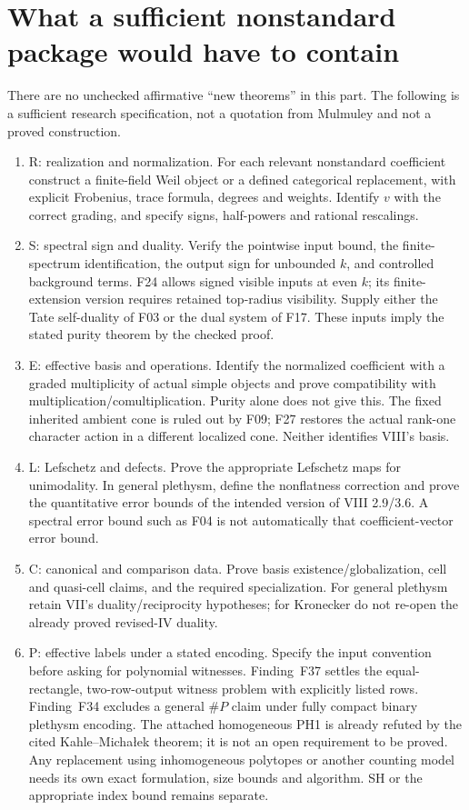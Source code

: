 \documentclass[11pt,a4paper]{article}
\newcommand{\fid}[1]{\textsf{#1}}\newcommand{\gate}[1]{\textsf{#1}}
\theoremstyle{named}\newtheorem{finding}{Finding}[section]
\theoremstyle{definition}\newtheorem{definition}[finding]{Definition}
\theoremstyle{remark}\newtheorem{remark}[finding]{Remark}
\begin{document}
\section{What a sufficient nonstandard package would have to contain}\label{sec:gates}
There are no unchecked affirmative ``new theorems'' in this part. The following is a sufficient research specification, not a quotation from Mulmuley and not a proved construction.

\begin{enumerate}
\item \gate{R: realization and normalization.} For each relevant nonstandard coefficient construct a finite-field Weil object or a defined categorical replacement, with explicit Frobenius, trace formula, degrees and weights. Identify $v$ with the correct grading, and specify signs, half-powers and rational rescalings.
\item \gate{S: spectral sign and duality.} Verify the pointwise input bound, the finite-spectrum identification, the output sign for unbounded $k$, and controlled background terms. F24 allows signed visible inputs at even $k$; its finite-extension version requires retained top-radius visibility. Supply either the Tate self-duality of \fid{F03} or the dual system of \fid{F17}. These inputs imply the stated purity theorem by the checked proof.
\item \gate{E: effective basis and operations.} Identify the normalized coefficient with a graded multiplicity of actual simple objects and prove compatibility with multiplication/comultiplication. Purity alone does not give this. The fixed inherited ambient cone is ruled out by \fid{F09}; F27 restores the actual rank-one character action in a different localized cone. Neither identifies VIII's basis.
\item \gate{L: Lefschetz and defects.} Prove the appropriate Lefschetz maps for unimodality. In general plethysm, define the nonflatness correction and prove the quantitative error bounds of the intended version of VIII 2.9/3.6. A spectral error bound such as \fid{F04} is not automatically that coefficient-vector error bound.
\item \gate{C: canonical and comparison data.} Prove basis existence/globalization, cell and quasi-cell claims, and the required specialization. For general plethysm retain VII's duality/reciprocity hypotheses; for Kronecker do not re-open the already proved revised-IV duality.
\item \gate{P: effective labels under a stated encoding.} Specify the input convention before asking for polynomial witnesses. Finding~\fid{F37} settles the equal-rectangle, two-row-output witness problem with explicitly listed rows. Finding~\fid{F34} excludes a general \(\#P\) claim under fully compact binary plethysm encoding. The attached homogeneous PH1 is already refuted by the cited Kahle--Micha{\l}ek theorem; it is not an open requirement to be proved. Any replacement using inhomogeneous polytopes or another counting model needs its own exact formulation, size bounds and algorithm. SH or the appropriate index bound remains separate.

\end{enumerate}
\end{document}
